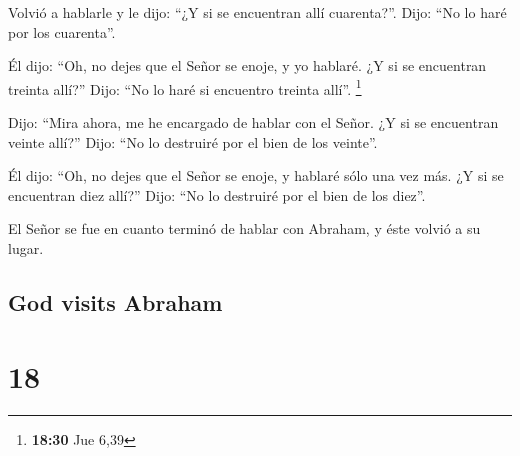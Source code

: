 \begin{paracol}{2}
 Volvió a hablarle y le dijo: ``¿Y si se encuentran allí
cuarenta?''. Dijo: ``No lo haré por los cuarenta''.

 Él dijo: ``Oh, no dejes que el Señor se enoje, y yo
hablaré. ¿Y si se encuentran treinta allí?'' Dijo: ``No lo haré si
encuentro treinta allí''. \footnote{\textbf{18:30} Jue 6,39}

 Dijo: ``Mira ahora, me he encargado de hablar con el
Señor. ¿Y si se encuentran veinte allí?'' Dijo: ``No lo destruiré por el
bien de los veinte''.

 Él dijo: ``Oh, no dejes que el Señor se enoje, y hablaré
sólo una vez más. ¿Y si se encuentran diez allí?'' Dijo: ``No lo
destruiré por el bien de los diez''.

 El Señor se fue en cuanto terminó de hablar con Abraham,
y éste volvió a su lugar.

\switchcolumn
\begin{otherlanguage}{english}

\hypertarget{god-visits-abraham}{%
\subsection{God visits Abraham}\label{god-visits-abraham}}

\hypertarget{section-35}{%
\section{18}\label{section-35}}


\end{otherlanguage}
\end{paracol}
